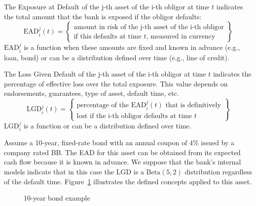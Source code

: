 \documentclass[11pt,fleqn]{book} %
\begin{document}
\begin{definition}
	The Exposure at Default of the j-th asset of the i-th obligor at time $t$
	indicates the total amount that the bank is exposed if the obligor defaults:
	\begin{displaymath}
		\text{EAD}_i^j(t) = \left\{
		\begin{array}{c}
			\text{amount in risk of the j-th asset of the i-th obligor} \\
			\text{if this defaults at time $t$, measured in currency}
		\end{array}
		\right\}
	\end{displaymath}
	$\text{EAD}_i^j$ is a function when these amounts are fixed and known in 
	advance (e.g., loan, bond) or can be a distribution defined over time 
	(e.g., line of credit).
\end{definition}

\begin{definition}
	The Loss Given Default of the j-th asset of the i-th obligor at time $t$ 
	indicates the percentage of effective loss over the total exposure. This
	value depends on endorsements, guarantees, type of asset, default time, etc.
	\begin{displaymath}
		\text{LGD}_i^j(t) = \left\{
		\begin{array}{c}
			\text{percentage of the $\text{EAD}_i^j(t)$ that is definitively} \\
			\text{lost if the i-th obligor defaults at time $t$}
		\end{array}
		\right\}
	\end{displaymath}
	$\text{LGD}_i^j$ is a function or can be a distribution defined over time.
\end{definition}

\begin{example}
	Assume a 10-year, fixed-rate bond with an annual coupon of $4\%$ issued 
	by a company rated BB\@. The EAD for this asset can be obtained from its 
	expected cash flow because it is known in advance. We suppose that the 
	bank's internal models indicate that in this case the LGD is a 
	$\text{Beta}(5,2)$ distribution regardless of the default time.
	Figure~\ref{figure:bond} illustrates the defined concepts applied 
	to this asset.
\end{example}

\begin{figure}[!ht]
	\centering
	\caption{10-year bond example}
	\label{figure:bond} 
\end{figure}
\end{document}
